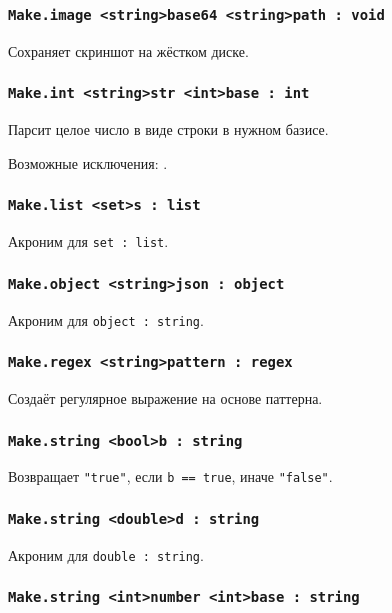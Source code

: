 \subsubsection{\lstinline|Make.image <string>base64 <string>path : void|}

Сохраняет скриншот на жёстком диске.

\subsubsection{\lstinline|Make.int <string>str <int>base : int|}

Парсит целое число в виде строки в нужном базисе.

Возможные исключения: .

\subsubsection{\lstinline|Make.list <set>s : list|}

Акроним для \lstinline|set : list|.

\subsubsection{\lstinline|Make.object <string>json : object|}

Акроним для \lstinline|object : string|.

\subsubsection{\lstinline|Make.regex <string>pattern : regex|}

Создаёт регулярное выражение на основе паттерна.

\subsubsection{\lstinline|Make.string <bool>b : string|}

Возвращает \lstinline|"true"|, если \lstinline|b == true|, иначе \lstinline|"false"|.

\subsubsection{\lstinline|Make.string <double>d : string|}

Акроним для \lstinline|double : string|.

\subsubsection{\lstinline|Make.string <int>number <int>base : string|}

